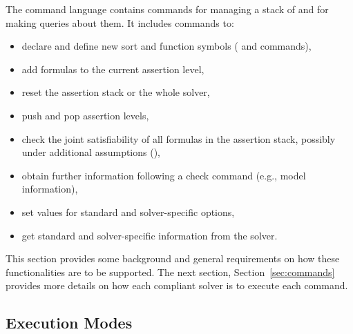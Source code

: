 The command language contains commands for managing a stack 
of  and for making queries about them.
It includes commands to:
%
\begin{itemize}
\item
declare and define new sort and function symbols
( and  commands),
\item
add formulas to the current assertion level,
\item
reset the assertion stack or the whole solver,
\item
push and pop assertion levels,
\item
check the joint satisfiability of all formulas in the assertion stack, 
possibly under additional assumptions (),
\item
obtain further information following a check command 
(e.g., model information),
\item
set values for standard and solver-specific options, 
\item
get standard and solver-specific information from the solver.
\end{itemize}

This section provides some background and general requirements on how 
these functionalities are to be supported.
The next section, Section~\ref{sec:commands} provides more details
on how each compliant solver is to execute each command.

\subsection{Execution Modes} \label{sec:modes}

